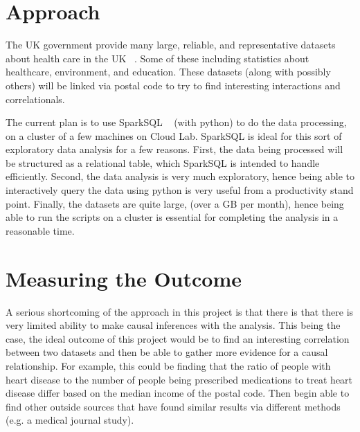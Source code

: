 \documentclass[a4paper]{article}
\begin{document}
\section{Approach}
	The UK government provide many large, reliable, and representative datasets about health care in the UK ~\cite{ref:UKDataSets}. Some of 
	these including statistics about healthcare, environment, and education. These datasets (along with possibly others) will 
	be linked via postal code to try to find interesting interactions and correlationals.

	The current plan is to use SparkSQL ~\cite{ref:SparkSQL} (with python) to do the data processing, on a cluster of a few machines on Cloud Lab. 
	SparkSQL is ideal for this sort of exploratory data analysis for a few reasons. First, the data being processed will be 
	structured as a relational table, which SparkSQL is intended to handle efficiently. Second, the data analysis
	is very much exploratory, hence being able to interactively query the data using python is very useful from 
	a productivity stand point. Finally, the datasets are quite large, (over a GB per month), hence being able to 
	run the scripts on a cluster is essential for completing the analysis in a reasonable time.


\section{Measuring the Outcome}
	A serious shortcoming of the approach in this project is that there is that there is very limited 
	ability to make causal inferences with the analysis. This being the case,
	the ideal outcome of this project would be to find an interesting correlation between two datasets 
	and then be able to gather more evidence for a causal relationship. For example, this could be
	finding that the ratio of people with heart disease to the number of people being prescribed
	medications to treat heart disease differ based on the median income of the postal code. Then 
	begin able to find other outside sources that have found similar results via different methods
	(e.g. a medical journal study). 


\printbibliography
\end{document}
